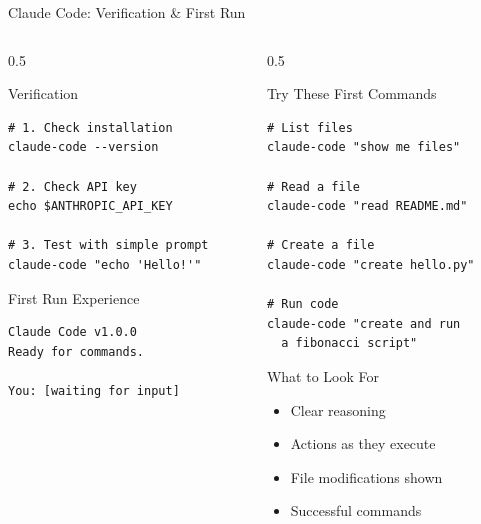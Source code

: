 \documentclass[aspectratio=169,11pt]{beamer}
\begin{document}
\begin{frame}[fragile]{Claude Code: Verification \& First Run}
    \begin{columns}[T]
        \begin{column}{0.5\textwidth}
            \begin{block}{Verification}
                \begin{lstlisting}[style=bash]
# 1. Check installation
claude-code --version

# 2. Check API key
echo $ANTHROPIC_API_KEY

# 3. Test with simple prompt
claude-code "echo 'Hello!'"
                \end{lstlisting}
            \end{block}

            \begin{block}{First Run Experience}
                \begin{lstlisting}[style=bash,numbers=none]
Claude Code v1.0.0
Ready for commands.

You: [waiting for input]
                \end{lstlisting}
            \end{block}
        \end{column}
        \begin{column}{0.5\textwidth}
            \begin{exampleblock}{Try These First Commands}
                \begin{lstlisting}[style=bash,numbers=none]
# List files
claude-code "show me files"

# Read a file
claude-code "read README.md"

# Create a file
claude-code "create hello.py"

# Run code
claude-code "create and run
  a fibonacci script"
                \end{lstlisting}
            \end{exampleblock}

            \begin{block}{What to Look For}
                \begin{itemize}
                    \item Clear reasoning
                    \item Actions as they execute
                    \item File modifications shown
                    \item Successful commands
                \end{itemize}
            \end{block}
        \end{column}
    \end{columns}

\end{frame}
\end{document}
